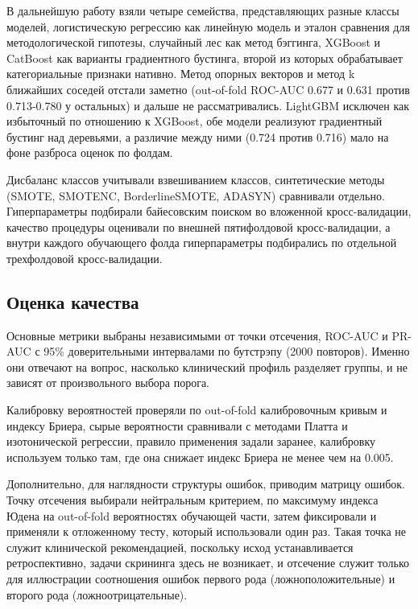 \documentclass[pdflatex,sn-basic,Numbered]{sn-jnl}
\begin{document}
В дальнейшую работу взяли четыре семейства, представляющих разные классы моделей, логистическую регрессию как линейную модель и эталон сравнения для методологической гипотезы, случайный лес как метод бэггинга, XGBoost и CatBoost как варианты градиентного бустинга, второй из которых обрабатывает категориальные признаки нативно. Метод опорных векторов и метод k ближайших соседей отстали заметно (out-of-fold ROC-AUC 0.677 и 0.631 против 0.713-0.780 у остальных) и дальше не рассматривались. LightGBM исключен как избыточный по отношению к XGBoost, обе модели реализуют градиентный бустинг над деревьями, а различие между ними (0.724 против 0.716) мало на фоне разброса оценок по фолдам.

Дисбаланс классов учитывали взвешиванием классов, синтетические методы (SMOTE, SMOTENC, BorderlineSMOTE, ADASYN) сравнивали отдельно. Гиперпараметры подбирали байесовским поиском во вложенной кросс-валидации, качество процедуры оценивали по внешней пятифолдовой кросс-валидации, а внутри каждого обучающего фолда гиперпараметры подбирались по отдельной трехфолдовой кросс-валидации.

\subsection{Оценка качества}\label{subsec2_9}

Основные метрики выбраны независимыми от точки отсечения, ROC-AUC и PR-AUC с 95\% доверительными интервалами по бутстрэпу (2000 повторов). Именно они отвечают на вопрос, насколько клинический профиль разделяет группы, и не зависят от произвольного выбора порога.

Калибровку вероятностей проверяли по out-of-fold калибровочным кривым и индексу Бриера, сырые вероятности сравнивали с методами Платта и изотонической регрессии, правило применения задали заранее, калибровку используем только там, где она снижает индекс Бриера не менее чем на 0.005.

Дополнительно, для наглядности структуры ошибок, приводим матрицу ошибок. Точку отсечения выбирали нейтральным критерием, по максимуму индекса Юдена на out-of-fold вероятностях обучающей части, затем фиксировали и применяли к отложенному тесту, который использовали один раз. Такая точка не служит клинической рекомендацией, поскольку исход устанавливается ретроспективно, задачи скрининга здесь не возникает, и отсечение служит только для иллюстрации соотношения ошибок первого рода (ложноположительные) и второго рода (ложноотрицательные).
\end{document}

